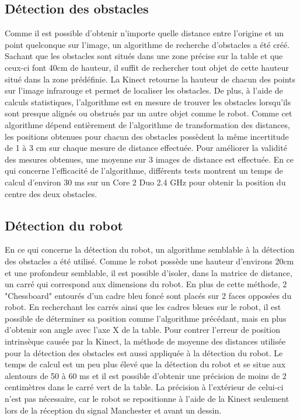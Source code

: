 \subsection{Détection des obstacles}
Comme il est possible d'obtenir n'importe quelle distance entre l'origine et un point quelconque sur l'image, un algorithme de recherche d'obstacles a été créé. Sachant que les obstacles sont situés dans une zone précise sur la table et que ceux-ci font 40cm de hauteur, il suffit de rechercher tout objet de cette hauteur situé dans la zone prédéfinie. La Kinect retourne la hauteur de chacun des points sur l'image infrarouge et permet de localiser les obstacles. De plus, à l'aide de calculs statistiques, l'algorithme est en mesure de trouver les obstacles lorsqu'ils sont presque alignés ou obstrués par un autre objet comme le robot. Comme cet algorithme dépend entièrement de l'algorithme de transformation des distances, les positions obtenues pour chacun des obstacles possèdent la même incertitude de 1 à 3 cm sur chaque mesure de distance effectuée. Pour améliorer la validité des mesures obtenues, une moyenne sur 3 images de distance est effectuée. En ce qui concerne l'efficacité de l'algorithme, différents tests montrent un temps de calcul d'environ 30 ms sur un Core 2 Duo 2.4 GHz pour obtenir la position du centre des deux obstacles.

\subsection{Détection du robot}
En ce qui concerne la détection du robot, un algorithme semblable à la détection des obstacles a été utilisé. Comme le robot possède une hauteur d'environs 20cm et une profondeur semblable, il est possible d'isoler, dans la matrice de distance, un carré qui correspond aux dimensions du robot. En plus de cette méthode, 2 "Chessboard" entourés d'un cadre bleu foncé sont placés sur 2 faces opposées du robot. En recherchant les carrés ainsi que les cadres bleues sur le robot, il est possible de déterminer sa position comme l'algorithme précédant, mais en plus d'obtenir son angle avec l'axe X de la table. Pour contrer l'erreur de position intrinsèque causée par la Kinect, la méthode de moyenne des distances utilisée pour la détection des obstacles est aussi appliquée à la détection du robot. Le temps de calcul est un peu plus élevé que la détection du robot et se situe aux alentours de 50 à 60 ms et il est possible d'obtenir une précision de moins de 2 centimètres dans le carré vert de la table. La précision à l'extérieur de celui-ci n'est pas nécessaire, car le robot se repositionne à l'aide de la Kinect seulement lors de la réception du signal Manchester et avant un dessin. 
